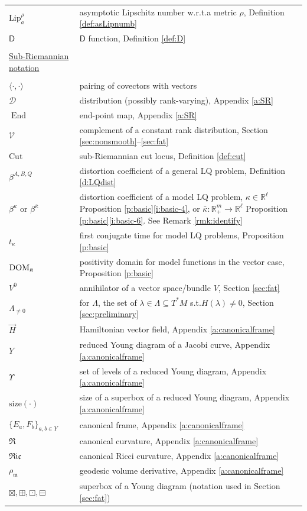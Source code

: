 \documentclass[11pt,a4paper]{article}
\theoremstyle{plain}
\theoremstyle{definition}
\theoremstyle{remark}
\numberwithin{equation}{section}
\newcommand{\R}{\mathbb{R}} %
\newcommand{\size}{\mathrm{size}}
\newcommand{\distr}{\mathscr{D}}
\newcommand{\ver}{\mathscr{V}}
\newcommand{\Cut}{\mathrm{Cut}}
\newcommand{\DOM}{{\rm{DOM}}}
\DeclareMathOperator{\End}{\mathrm{End}}
\newcommand{\Lip}{\mathrm{Lip}}
\newcommand{\mm}{\mathfrak m}
\newcommand{\sfD}{\mathsf D}
\begin{document}
\begin{xltabular}{\textwidth}{p{0.22\textwidth} X}
$\Lip^\rho_a$ \dotfill & asymptotic Lipschitz number w.r.t.\@ a metric $\rho$, Definition \ref{def:asLipnumb} \\
$\sfD$ \dotfill & $\sfD$ function,  Definition \ref{def:D} \\
& \\
\underline{Sub-Riemannian notation} & \\
& \\
$\langle\cdot,\cdot\rangle$ \dotfill & pairing of covectors with vectors \\
$\distr$ \dotfill & distribution (possibly rank-varying), Appendix \ref{a:SR}\\
$\End$ \dotfill & end-point map, Appendix \ref{a:SR} \\
$\ver$ \dotfill & complement of a constant rank distribution, Section \ref{sec:nonsmooth}--\ref{sec:fat} \\
$\Cut$ \dotfill & sub-Riemannian cut locus, Definition \ref{def:cut}\\
$\beta^{A,B,Q}$ \dotfill & distortion coefficient of a general LQ problem, Definition \ref{d:LQdist} \\
$\beta^\kappa$ or $\beta^{\bar\kappa}$ \dotfill & distortion coefficient of a model LQ problem, $\kappa \in \R^\ell$ Proposition \ref{p:basic}\ref{i:basic-4}, or $\bar\kappa: \R^m_+\to \R^\ell$ Proposition \ref{p:basic}\ref{i:basic-6}. See Remark \ref{rmk:identify} \\
$t_\kappa$ \dotfill & first conjugate time for model LQ problems, Proposition \ref{p:basic} \\
$\DOM_{\bar{\kappa}}$ \dotfill & positivity domain for model functions in the vector case, Proposition \ref{p:basic} \\
$V^0$ \dotfill & annihilator of a vector space/bundle $V$, Section \ref{sec:fat} \\
$\Lambda_{\neq 0}$ \dotfill & for $\Lambda$, the set of $\lambda\in\Lambda \subseteq T^*M$ s.t.\@ $H(\lambda)\neq 0$, Section \ref{sec:preliminary} \\
$\vec{H}$ \dotfill & Hamiltonian vector field, Appendix \ref{a:canonicalframe}\\
$Y$ \dotfill & reduced Young diagram of a Jacobi curve, Appendix \ref{a:canonicalframe}\\
$\Upsilon$ \dotfill & set of levels of a reduced Young diagram, Appendix \ref{a:canonicalframe}\\
$\size(\cdot)$ \dotfill & size of a superbox of a reduced Young diagram, Appendix \ref{a:canonicalframe} \\
$\{E_a,F_b\}_{a,b\in Y}$ \dotfill & canonical frame, Appendix \ref{a:canonicalframe} \\
$\mathfrak{R}$ \dotfill & canonical curvature, Appendix \ref{a:canonicalframe} \\
$\mathfrak{Ric}$ \dotfill & canonical Ricci curvature, Appendix \ref{a:canonicalframe} \\
$\rho_{\mm}$ \dotfill & geodesic volume derivative, Appendix \ref{a:canonicalframe}\\
$\boxtimes,\boxplus,\boxdot,\boxminus$ \dotfill & superbox of a Young diagram (notation used in Section \ref{sec:fat}) \\
\end{xltabular}
\end{document}
